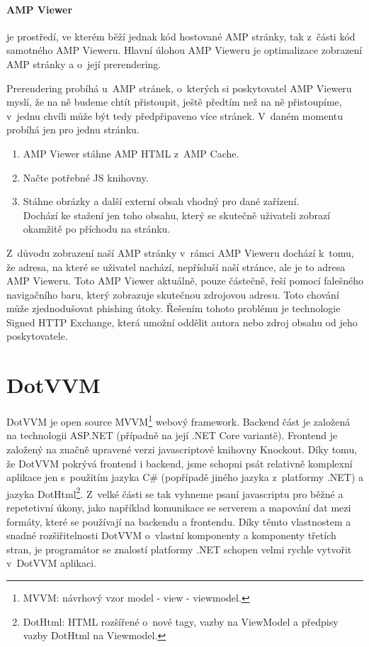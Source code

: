 \subsubsection*{AMP Viewer}
 je prostředí, ve kterém běží jednak kód hostované AMP stránky, tak z~části kód samotného AMP Vieweru. Hlavní úlohou AMP Vieweru je optimalizace zobrazení AMP stránky a o~její prerendering.

Prerendering probíhá u~AMP stránek, o~kterých si poskytovatel AMP Vieweru myslí, že na ně budeme chtít přistoupit, ještě předtím než na ně přistoupíme, v~jednu chvíli může být tedy předpřipaveno více stránek. V~daném momentu probíhá jen pro jednu stránku. 
\begin{gatger}
\begin{enumerate}
    \item AMP Viewer stáhne AMP HTML z~AMP Cache.
    \item Načte potřebné JS knihovny.
    \item Stáhne obrázky a další externí obsah vhodný pro dané zařízení. \\
    Dochází ke stažení jen toho obsahu, který se skutečně uživateli zobrazí okamžitě po příchodu na stránku\cite{ampConf}.
\end{enumerate}
\end{gatger}
Z~důvodu zobrazení naší AMP stránky v~rámci AMP Vieweru dochází k~tomu, že adresa, na které se uživatel nachází, nepřísluší naší stránce, ale je to adresa AMP Vieweru. Toto AMP Viewer aktuálně, pouze částečně, řeší pomocí falešného navigačního baru, který zobrazuje skutečnou zdrojovou adresu. Toto chování může zjednodušovat phishing útoky\cite[Ch.\ 3, p.\ 50]{VzhuruDoAMP}.
Řešením tohoto problému je technologie Signed HTTP Exchange, která umožní oddělit autora nebo zdroj obsahu od jeho poskytovatele\cite[Ch.\ 3, p.\ 51]{VzhuruDoAMP}.
\chapter{DotVVM}
DotVVM je open source MVVM\footnote{MVVM: návrhový vzor model - view - viewmodel.} webový framework\cite{DotVVMIntro}. Backend část je založená na technologii ASP.NET (případně na její .NET Core variantě). Frontend je založený na značně upravené verzi javascriptové knihovny Knockout. Díky tomu, že DotVVM pokrývá frontend i backend, jsme schopni psát relativně komplexní aplikace jen s~použitím jazyka C\# (popřípadě jiného jazyka z~platformy .NET) a jazyka DotHtml\footnote{DotHtml: HTML rozšířené o~nové tagy, vazby na ViewModel a předpisy vazby DotHtml na Viewmodel.}. Z~velké části se tak vyhneme psaní javascriptu pro běžné a repetetivní úkony, jako například komunikace se serverem a mapování dat mezi formáty, které se používají na backendu a frontendu.
Díky těmto vlastnostem a snadné rozšiřitelnosti DotVVM o~vlastní komponenty a komponenty třetích stran, je programátor se znalostí platformy .NET schopen velmi rychle vytvořit v~DotVVM aplikaci.

